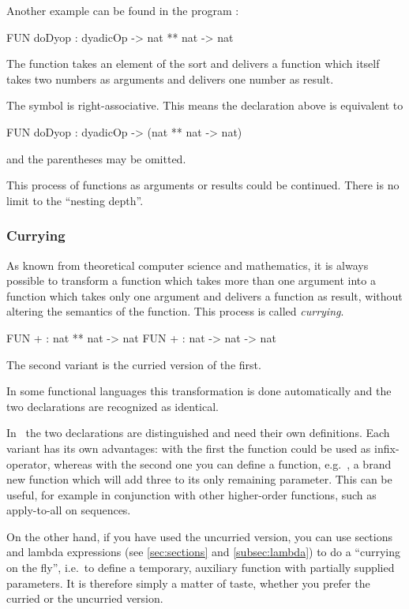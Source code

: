 Another example can be found in the program :
\begin{prog}
        FUN doDyop : dyadicOp -> nat ** nat -> nat
\end{prog}
The function  takes an element of the sort 
and delivers a function which itself takes two numbers as arguments and
delivers one number as result.

The symbol \pro{->} is right-associative. This means the declaration
above is equivalent to 
\begin{prog}
        FUN doDyop : dyadicOp -> (nat ** nat -> nat)
\end{prog}
and the parentheses may be omitted.

This process of functions as arguments or results could be continued.
There is no limit to the ``nesting depth''.


\subsubsection{Currying}
\label{sec:currying}
\advanced
As known from theoretical computer science and mathematics, it is
always possible to transform a function which takes more than one
argument into a function which takes only one argument and delivers a
function as result, without altering the semantics of the function.
This process is called {\em currying\/}.
\begin{prog}
        FUN + : nat ** nat -> nat
        FUN + : nat -> nat -> nat
\end{prog}
The second  variant is the curried version of the first.

In some functional languages this transformation is done automatically and the
two declarations are recognized as identical.

In \opal\ the two declarations are distinguished and need their own
definitions. 
Each variant has its own advantages:
with the first the function \pro{+} could be used as
infix-operator, whereas with the second one you can define a function,
e.g.~, a brand  new function which will add three to
its only remaining parameter.
This can be useful, for example in conjunction with other higher-order
functions, such as  apply-to-all on sequences.

On the other hand, if you have used the uncurried version, you can use
sections and lambda expressions (see 
\ref{sec:sections} and \ref{subsec:lambda}) to do a
``currying on the fly'', i.e.~to
define a temporary, auxiliary function with partially supplied
parameters.
It is therefore simply  a matter of taste, whether you prefer the
curried or the uncurried version.

